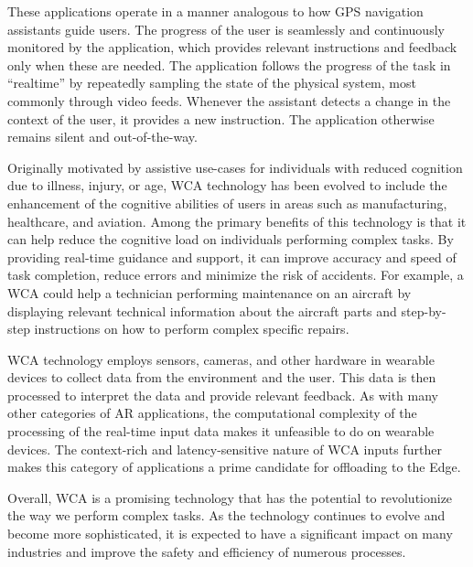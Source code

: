 These applications operate in a manner analogous to how \gls{GPS} navigation assistants guide users. 
The progress of the user is seamlessly and continuously monitored by the application, which provides relevant instructions and feedback only when these are needed.
The application follows the progress of the task in ``realtime'' by repeatedly sampling the state of the physical system, most commonly through video feeds.
Whenever the assistant detects a change in the context of the user, it provides a new instruction.
The application otherwise remains silent and out-of-the-way.

Originally motivated by assistive use-cases for individuals with reduced cognition due to illness, injury, or age, \gls{WCA} technology has been evolved to include the enhancement of the cognitive abilities of users in areas such as manufacturing, healthcare, and aviation.
Among the primary benefits of this technology is that it can help reduce the cognitive load on individuals performing complex tasks.
By providing real-time guidance and support, it can improve accuracy and speed of task completion, reduce errors and minimize the risk of accidents.
For example, a \gls{WCA} could help a technician performing maintenance on an aircraft by displaying relevant technical information about the aircraft parts and step-by-step instructions on how to perform complex specific repairs.

\gls{WCA} technology employs sensors, cameras, and other hardware in wearable devices to collect data from the environment and the user.
This data is then processed to interpret the data and provide relevant feedback.
As with many other categories of \gls{AR} applications, the computational complexity of the processing of the real-time input data makes it unfeasible to do on wearable devices.
The context-rich and latency-sensitive nature of \gls{WCA} inputs further makes this category of applications a prime candidate for offloading to the Edge.

Overall, \gls{WCA} is a promising technology that has the potential to revolutionize the way we perform complex tasks.
As the technology continues to evolve and become more sophisticated, it is expected to have a significant impact on many industries and improve the safety and efficiency of numerous processes.

\subsection{}\label{background:ncs}

